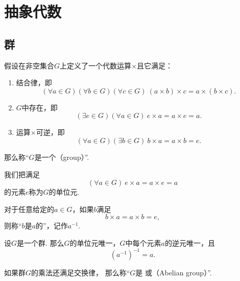 \section{抽象代数}

\subsection{群}
\begin{definition}
假设在非空集合\(G\)上定义了一个代数运算\(\times\)且它满足：
\begin{enumerate}
    \item 结合律，即\[
        (\forall a \in G)(\forall b \in G)(\forall c \in G)\:
        (a \times b) \times c = a \times (b \times c).
    \]

    \item \(G\)中存在，即\[
        (\exists e \in G)(\forall a \in G)\:
        e \times a = a \times e = a.
    \]

    \item 运算\(\times\)可逆，即\[
        (\forall a \in G)(\exists b \in G)\:
        b \times a = a \times b = e.
    \]
\end{enumerate}
那么称“\(G\)是一个（group）”.
\end{definition}

\begin{definition}
我们把满足\[
    (\forall a \in G)\:
    e \times a = a \times e = a
\]的元素\(e\)称为\(G\)的单位元.
\end{definition}

\begin{definition}
对于任意给定的\(a \in G\)，如果\(b\)满足\[
    b \times a = a \times b = e,
\]
则称“\(b\)是\(a\)的”，记作\(a^{-1}\).
\end{definition}

\begin{property}
设\(G\)是一个群.
那么\(G\)的单位元唯一，\(G\)中每个元素\(a\)的逆元唯一，且\[
    (a^{-1})^{-1} = a.
\]
\end{property}

\begin{definition}
如果群\(G\)的乘法还满足交换律，
那么称“\(G\)是%
或（Abelian group）”.
\end{definition}

